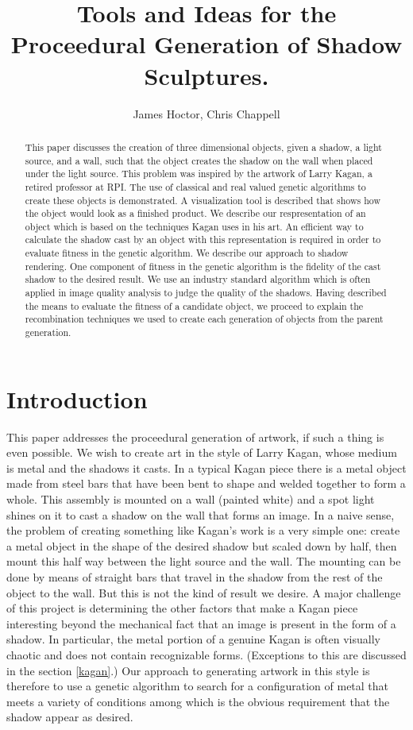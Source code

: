 \documentclass[10pt]{article}
\title{Tools and Ideas for the Proceedural Generation of Shadow Sculptures.}
\author{James Hoctor, Chris Chappell}
\begin{document}
\maketitle

\begin{abstract}
This paper discusses the creation of three dimensional objects,
given a shadow, a light source, and a wall, such that the object
creates the shadow on the wall when placed under the light source.
This problem was inspired by the artwork of Larry Kagan, a retired
professor at RPI. The use of classical and real valued genetic
algorithms to create these objects is demonstrated. A visualization
tool is described that shows how the object would look as a finished
product. We describe our respresentation of an object which is based
on the techniques Kagan uses in his art. An efficient way to
calculate the shadow cast by an object with this representation is
required in order to evaluate fitness in the genetic algorithm. We
describe our approach to shadow rendering. One component of fitness
in the genetic algorithm is the fidelity of the cast shadow to the
desired result. We use an industry standard algorithm which is often
applied in image quality analysis to judge the quality of the
shadows. Having described the means to evaluate the fitness of a
candidate object, we proceed to explain the recombination techniques
we used to create each generation of objects from the parent generation.
\end{abstract}

\section*{Introduction}
This paper addresses the proceedural generation of artwork, if such
a thing is even possible. We wish to create art in the style of
Larry Kagan, whose medium is metal and the shadows it casts. In a
typical Kagan piece there is a metal object made from steel bars
that have been bent to shape and welded together to form a whole.
This assembly is mounted on a wall (painted white) and a spot light
shines on it to cast a shadow on the wall that forms an image. In a
naive sense, the problem  of creating something like Kagan's work is
a very simple one: create a metal object in the shape of the desired
shadow but scaled down by half, then mount this half way between the
light source and the wall. The mounting can be done by means of
straight bars that travel in the shadow from the rest of the object
to the wall. But this is not the kind of result we desire. A major
challenge of this project is determining the other factors that make
a Kagan piece interesting beyond the mechanical fact that an image
is present in the form of a shadow. In particular, the metal portion
of a genuine Kagan is often visually chaotic and does not contain
recognizable forms. (Exceptions to this are discussed in the section
\ref{kagan}.) Our approach to generating artwork in this style
is therefore to use a genetic algorithm to search for a configuration
of metal that meets a variety of conditions among which is the
obvious requirement that the shadow appear as desired.
\end{document}
